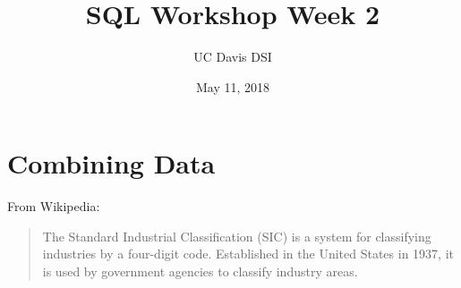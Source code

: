 \documentclass[10pt]{exam}
\begin{document}
 
\title{SQL Workshop Week 2}
\author{UC Davis DSI}
\date{May 11, 2018}

\maketitle

\section{Combining Data}

From Wikipedia:

    \begin{quote}
        The Standard Industrial Classification (SIC) is a system for
        classifying industries by a four-digit code. Established in the
        United States in 1937, it is used by government agencies to
        classify industry areas.
    \end{quote}
\end{document}
